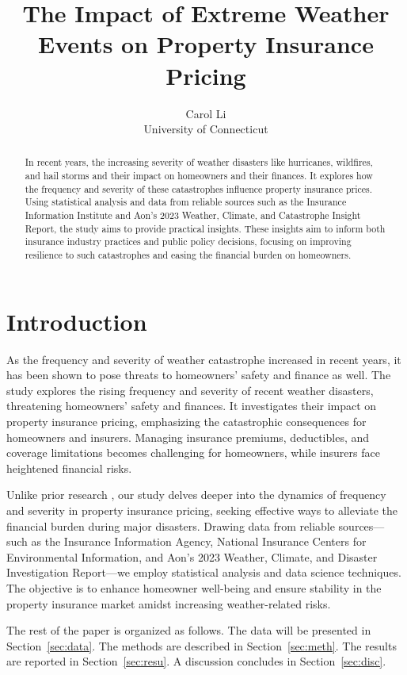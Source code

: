 \documentclass[12pt]{article}
\title{The Impact of Extreme Weather Events on Property Insurance Pricing}
\author{Carol Li\\
    University of Connecticut
}
\begin{document}
\maketitle

\begin{abstract}
    In recent years, the increasing severity of weather disasters like hurricanes, wildfires, and hail storms and 
    their impact on homeowners and their finances. It explores how the frequency and severity of these catastrophes influence property 
    insurance prices. Using statistical analysis and data from reliable sources such as the Insurance Information Institute and Aon's 
    2023 Weather, Climate, and Catastrophe Insight Report, the study aims to provide practical insights. These insights aim to inform 
    both insurance industry practices and public policy decisions, focusing on improving resilience to such catastrophes and easing 
    the financial burden on homeowners.
\end{abstract}


\section{Introduction}
\label{sec:intro}
As the frequency and severity of weather catastrophe increased in recent years, it has been shown to pose threats to homeowners' 
safety and finance as well. The study explores the rising frequency and severity of recent weather disasters, threatening homeowners' 
safety and finances. It investigates their impact on property insurance pricing, emphasizing the catastrophic consequences for 
homeowners and insurers. Managing insurance premiums, deductibles, and coverage limitations becomes challenging for homeowners, 
while insurers face heightened financial risks.

Unlike prior research \cite{hurricaneeco}, our study delves deeper into the dynamics of frequency and severity in property insurance 
pricing, seeking effective ways to alleviate the financial burden during major disasters. Drawing data from reliable sources—such as 
the Insurance Information Agency, National Insurance Centers for Environmental Information, and Aon's 2023 Weather, Climate, and 
Disaster Investigation Report—we employ statistical analysis and data science techniques. The objective is to enhance homeowner 
well-being and ensure stability in the property insurance market amidst increasing weather-related risks.


The rest of the paper is organized as follows.
The data will be presented in Section~\ref{sec:data}.
The methods are described in Section~\ref{sec:meth}.
The results are reported in Section~\ref{sec:resu}.
A discussion concludes in Section~\ref{sec:disc}.
\end{document}
